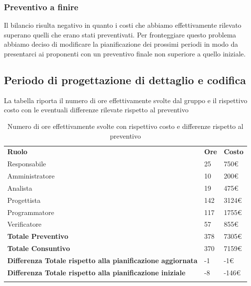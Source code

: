 		\subsubsection{Preventivo a finire}
		Il bilancio risulta negativo in quanto i costi che abbiamo effettivamente rilevato superano quelli che erano stati preventivati. Per fronteggiare questo problema abbiamo deciso di modificare la pianificazione dei prossimi periodi in modo da presentarci ai proponenti con un preventivo finale non superiore a quello iniziale.




		
\pagebreak
\subsection{Periodo di progettazione di dettaglio e codifica}
La tabella riporta il numero di ore effettivamente svolte dal gruppo e il rispettivo costo con le eventuali differenze rilevate rispetto al preventivo
\begin{longtable} {							
		>{}p{96mm}  
		>{}p{16mm}
		>{}p{16mm}			
	}			
	\rowcolor{gray!50}
	
	\textbf{Ruolo}            & \textbf{Ore} & \textbf{Costo}       \TBstrut \\
	Responsabile              & 25           & 750\euro             \TBstrut \\
	Amministratore            & 10           & 200\euro             \TBstrut \\
	Analista                  & 19           & 475\euro             \TBstrut \\
	Progettista               & 142          & 3124\euro            \TBstrut \\
	Programmatore             & 117          & 1755\euro            \TBstrut \\
	Verificatore              & 57           & 855\euro             \TBstrut \\
	\textbf{Totale Preventivo}& 378          & 7305\euro            \TBstrut \\	
	\textbf{Totale Consuntivo}& 370          & 7159\euro            \TBstrut \\	
	\textbf{Differenza Totale rispetto alla pianificazione aggiornata}& -1          & -1\euro              \TBstrut \\
	\textbf{Differenza Totale rispetto alla pianificazione iniziale}& -8           & -146\euro              \TBstrut \\
	\rowcolor{white}
	\caption{Numero di ore effettivamente svolte con rispettivo costo e differenze rispetto al preventivo}	
\end{longtable}

